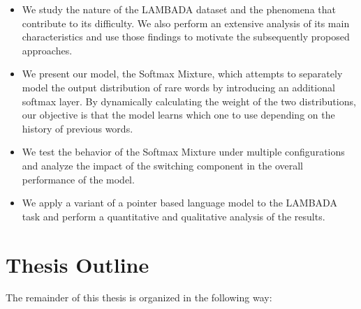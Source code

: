 \begin{itemize}

\item We study the nature of the LAMBADA dataset and the phenomena that contribute to its difficulty. We also perform an extensive analysis of its main characteristics and use those findings to motivate the subsequently proposed approaches. 

\item We present our model, the Softmax Mixture, which attempts to separately model the output distribution of rare words by introducing an additional softmax layer. By dynamically calculating the weight of the two distributions, our objective is that the model learns which one to use depending on the history of previous words.

\item We test the behavior of the Softmax Mixture under multiple configurations and analyze the impact of the switching component in the overall performance of the model.

\item We apply a variant of a pointer based language model to the LAMBADA task and perform a quantitative and qualitative analysis of the results.

\end{itemize}

\section{Thesis Outline}
\label{sec:outline}

The remainder of this thesis is organized in the following way:

